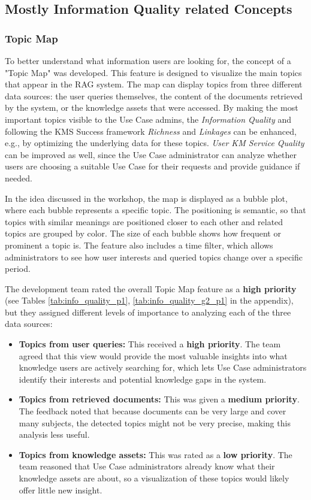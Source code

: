 \documentclass[
	english,
	ruledheaders=section,%
	class=report,%
	thesis={type=bachelor},%
	accentcolor=1b,%
	custommargins=true,%
	marginpar=false,%
	parskip=half-,%
	fontsize=11pt,%
	DIV=14,
]{tudapub}
\begin{document}
\subsection{Mostly Information Quality related Concepts}
\subsubsection{Topic Map}
To better understand what information users are looking for, the concept of a "Topic Map" was developed. This feature is designed to visualize the main topics that appear in the RAG system. The map can display topics from three different data sources: the user queries themselves, the content of the documents retrieved by the system, or the knowledge assets that were accessed. By making the most important topics visible to the Use Case admins, the \textit{Information Quality} and following the KMS Success framework \textit{Richness} and \textit{Linkages} \parencite[pp.~57--58]{Jennex2006} can be enhanced, e.g., by optimizing the underlying data for these topics. \textit{User KM Service Quality} \parencite[pp.~58--59]{Jennex2006} can be improved as well, since the Use Case administrator can analyze whether users are choosing a suitable Use Case for their requests and provide guidance if needed.

In the idea discussed in the workshop, the map is displayed as a bubble plot, where each bubble represents a specific topic. The positioning is semantic, so that topics with similar meanings are positioned closer to each other and related topics are grouped by color. The size of each bubble shows how frequent or prominent a topic is. The feature also includes a time filter, which allows administrators to see how user interests and queried topics change over a specific period.

The development team rated the overall Topic Map feature as a \textbf{high priority} (see Tables  \ref{tab:info_quality_p1}, \ref{tab:info_quality_g2_p1} in the appendix), but they assigned different levels of importance to analyzing each of the three data sources:

\begin{itemize}
    \item \textbf{Topics from user queries:} This received a \textbf{high priority}. The team agreed that this view would provide the most valuable insights into what knowledge users are actively searching for, which lets Use Case administrators identify their interests and potential knowledge gaps in the system.
    
    \item \textbf{Topics from retrieved documents:} This was given a \textbf{medium priority}. The feedback noted that because documents can be very large and cover many subjects, the detected topics might not be very precise, making this analysis less useful.
    
    \item \textbf{Topics from knowledge assets:} This was rated as a \textbf{low priority}. The team reasoned that Use Case administrators already know what their knowledge assets are about, so a visualization of these topics would likely offer little new insight.
\end{itemize}
\end{document}
